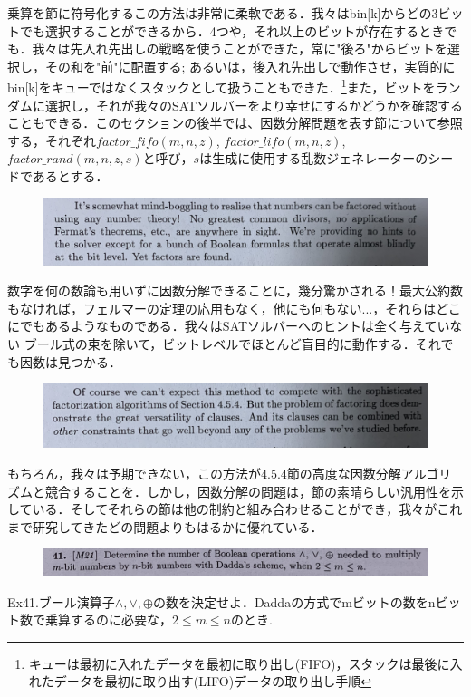 \documentclass[dvipdfmx,a4paper,12pt]{jsarticle}
\begin{document}
乗算を節に符号化するこの方法は非常に柔軟である．我々はbin[k]からどの3ビットでも選択することができるから．4つや，それ以上のビットが存在するときでも．我々は先入れ先出しの戦略を使うことができた，常に"後ろ"からビットを選択し，その和を"前"に配置する; あるいは，後入れ先出しで動作させ，実質的にbin[k]をキューではなくスタックとして扱うこともできた．\footnote{キューは最初に入れたデータを最初に取り出し(FIFO)，スタックは最後に入れたデータを最初に取り出す(LIFO)データの取り出し手順}また，ビットをランダムに選択し，それが我々のSATソルバーをより幸せにするかどうかを確認することもできる．このセクションの後半では、因数分解問題を表す節について参照する，それぞれ$factor\_fifo(m,n,z)$, $factor\_lifo(m,n,z)$, $factor\_rand(m,n,z,s)$と呼び，$s$は生成に使用する乱数ジェネレーターのシードであるとする．
\newpage
\begin{figure}[htbp]
  \centering
  \includegraphics[width=130mm]{images/IMG_73812.jpg}
\end{figure}
数字を何の数論も用いずに因数分解できることに，幾分驚かされる！最大公約数もなければ，フェルマーの定理の応用もなく，他にも何もない...，それらはどこにでもあるようなものである．我々はSATソルバーへのヒントは全く与えていない
ブール式の束を除いて，ビットレベルでほとんど盲目的に動作する．それでも因数は見つかる．
\begin{figure}[htbp]
  \centering
  \includegraphics[width=130mm]{images/IMG_73813.jpg}
  \end{figure}

  もちろん，我々は予期できない，この方法が4.5.4節の高度な因数分解アルゴリズムと競合することを．しかし，因数分解の問題は，節の素晴らしい汎用性を示している．そしてそれらの節は他の制約と組み合わせることができ，我々がこれまで研究してきたどの問題よりもはるかに優れている．


\newpage
\begin{figure}[htbp]
  \centering
  \includegraphics[width=130mm]{images/e1.jpeg}
\end{figure}
Ex41.ブール演算子$\wedge ,\vee ,\oplus$の数を決定せよ．Daddaの方式でmビットの数をnビット数で乗算するのに必要な，$2 \leq m \leq n$のとき.
\end{document}
